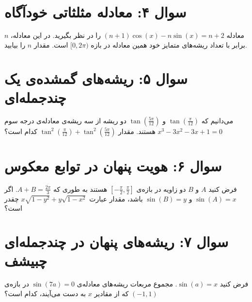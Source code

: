 \documentclass[12pt]{article}
\begin{document}
	
	\vspace{1cm}
	\hrulefill
	\vspace{1cm}
	\section*{سوال ۴: معادله مثلثاتی خودآگاه}
	معادله \((n + 1)\cos(x) - n \sin(x) = n + 2\) را در نظر بگیرید. در این معادله، \(n\) برابر با تعداد ریشه‌های متمایز خود همین معادله در بازه \([0, 2\pi)\) است. مقدار \(n\) را بیابید.
	
	
	\vspace{1cm}
	\hrulefill
	\vspace{1cm}
	\section*{سوال ۵: ریشه‌های گمشده‌ی یک چندجمله‌ای}
	می‌دانیم که \( \tan(\frac{\pi}{12}) \) و \( \tan(\frac{5\pi}{12}) \) دو ریشه از سه ریشه‌ی معادله‌ی درجه سوم \( x^3 - 3x^2 - 3x + 1 = 0 \) هستند. مقدار \( \tan^2(\frac{\pi}{12}) + \tan^2(\frac{5\pi}{12}) \) کدام است؟
	
	
	\vspace{1cm}
	\hrulefill
	\vspace{1cm}
	\section*{سوال ۶: هویت پنهان در توابع معکوس}
	فرض کنید \(A\) و \(B\) دو زاویه در بازه‌ی \( [-\frac{\pi}{2}, \frac{\pi}{2}] \) هستند به طوری که \(A+B = \frac{2\pi}{3}\). اگر \( \sin(A) = x \) و \( \sin(B) = y \) باشد، مقدار عبارت \( x\sqrt{1-y^2} + y\sqrt{1-x^2} \) چقدر است؟
	
	
	\vspace{1cm}
	\hrulefill
	\vspace{1cm}
	\section*{سوال ۷: ریشه‌های پنهان در چندجمله‌ای چبیشف}
	فرض کنید \(\sin(a) = x\). مجموع مربعات ریشه‌های معادله‌ی \( \sin(7a) = 0 \) در بازه‌ی \( (-1, 1) \) که از مقادیر \(x\) به دست می‌آیند، کدام است؟
	
\end{document}
